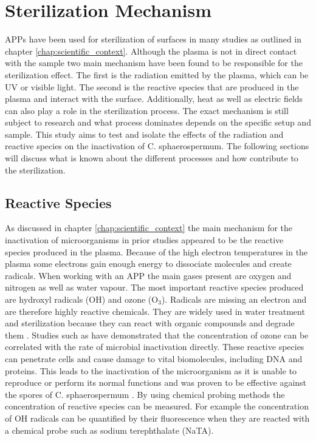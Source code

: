 \section{Sterilization Mechanism}
APPs have been used for sterilization of surfaces in many studies as outlined in chapter \ref{chap:scientific_context}. Although the plasma is not in direct contact with the sample two main mechanism have been found to be responsible for the sterilization effect. The first is the radiation emitted by the plasma, which can be UV or visible light. The second is the reactive species that are produced in the plasma and interact with the surface. Additionally, heat as well as electric fields can also play a role in the sterilization process. The exact mechanism is still subject to research and what process dominates depends on the specific setup and sample. This study aims to test and isolate the effects of the radiation and reactive species on the inactivation of C. sphaerospermum. The following sections will discuss what is known about the different processes and how contribute to the sterilization.

\subsection{Reactive Species}
As discussed in chapter \ref{chap:scientific_context} the main mechanism for the inactivation of microorganisms in prior studies appeared to be the reactive species produced in the plasma. Because of the high electron temperatures in the plasma some electrons gain enough energy to dissociate molecules and create radicals. When working with an APP the main gases present are oxygen and nitrogen as well as water vapour. The most important reactive species produced are hydroxyl radicals (OH) and ozone (O$_3$). Radicals are missing an electron and are therefore highly reactive chemicals. They are widely used in water treatment and sterilization because they can react with organic compounds and degrade them \cite{water}. Studies such as \cite{ozone} have demonstrated that the concentration of ozone can be correlated with the rate of microbial inactivation directly. These reactive species can penetrate cells and cause damage to vital biomolecules, including DNA and proteins.
This leads to the inactivation of the microorganism as it is unable to reproduce or perform its normal functions and was proven to be effective against the spores of C. sphaerospermum \cite{kit}. By using chemical probing methods the concentration of reactive species can be measured. For example the concentration of OH radicals can be quantified by their fluorescence when they are reacted with a chemical probe such as sodium terephthalate (NaTA). 

